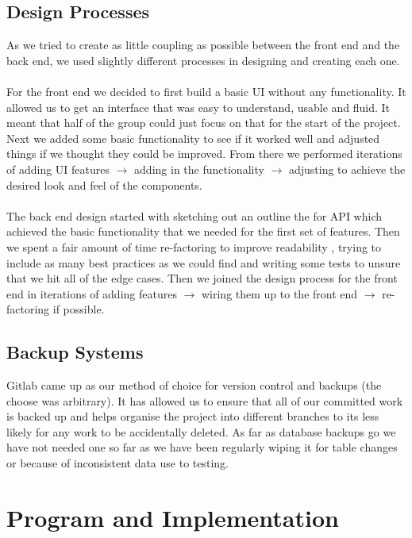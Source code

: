 \documentclass[10pt,a4paper]{article}
\begin{document}
\subsection{Design Processes}

As we tried to create as little coupling as possible between the front end and the back end, we used slightly different processes in designing and creating each one.  
\\
\\
\noindent For the front end we decided to first build a basic UI without any functionality. It allowed us to get an interface that was easy to understand, usable and fluid. It meant that half of the group could just focus on that for the start of the project. Next we added some basic functionality to see if it worked well and adjusted things if we thought they could be improved. From there we performed iterations of adding UI features $\rightarrow$ adding in the functionality $\rightarrow$ adjusting to achieve the desired look and feel of the components.
\\
\\
\noindent The back end design started with sketching out an outline the for API which achieved the basic functionality that we needed for the first set of features. Then we spent a fair amount of time re-factoring to improve readability , trying to include as many best practices as we could find and writing some tests to unsure that we hit all of the edge cases. Then we joined the design process for the front end in iterations of adding features $\rightarrow$ wiring them up to the front end $\rightarrow$ re-factoring if possible.     

\subsection{Backup Systems}

Gitlab came up as our method of choice for version control and backups (the choose was arbitrary). It has allowed us to ensure that all of our committed work is backed up and helps organise the project into different branches to its less likely for any work to be accidentally deleted. As far as database backups go we have not needed one so far as we have been regularly wiping it for table changes or because of inconsistent data use to testing. 

\section{Program and Implementation}
\end{document}
